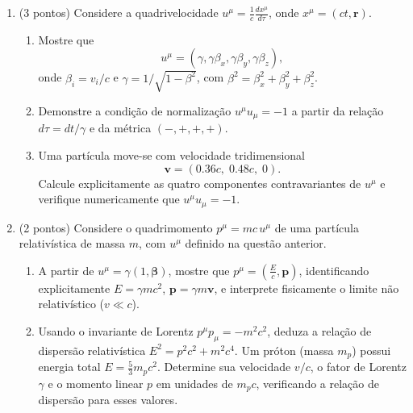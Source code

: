 \begin{enumerate}
\begin{enumerate}
              \item A partir desse resultado, mostre que tanto o intervalo
                    $\Delta s^2 = \eta_{\mu\nu}\,\Delta x^\mu \Delta x^\nu$
                    quanto o tempo próprio
                    $\Delta\tau = \int \sqrt{-\eta_{\mu\nu}\,\dot{x}^\mu\dot{x}^\nu}\,dt$
                    são invariantes sob transformações de Lorentz.
          \end{enumerate}

    \item (3 pontos) Considere a quadrivelocidade
          $u^\mu = \frac{1}{c}\frac{dx^\mu}{d\tau}$, onde $x^\mu = (ct, \mathbf r)$.
          \begin{enumerate}
              \item Mostre que
                    $$
                        u^\mu=(\gamma,\gamma\beta_x,\gamma\beta_y,\gamma\beta_z),
                    $$
                    onde $\beta_i=v_i/c$ e $\gamma=1/\sqrt{1-\beta^2}$, com
                    $\beta^2 = \beta_x^2+\beta_y^2+\beta_z^2$.

              \item Demonstre a condição de normalização $u^\mu u_\mu=-1$ a
                    partir da relação $d\tau = dt/\gamma$ e da métrica
                    $(-,+,+,+)$.

              \item Uma partícula move-se com velocidade tridimensional
                    $$
                        \mathbf v=(0.36c,\;0.48c,\;0).
                    $$
                    Calcule explicitamente as quatro componentes
                    contravariantes de $u^\mu$ e verifique numericamente que
                    $u^\mu u_\mu = -1$.
          \end{enumerate}

    \item (2 pontos) Considere o quadrimomento $p^\mu = mc\,u^\mu$ de uma
          partícula relativística de massa $m$, com $u^\mu$ definido na
          questão anterior.
          \begin{enumerate}
              \item A partir de $u^\mu = \gamma(1, \boldsymbol\beta)$, mostre que
                    $p^\mu = \left( \frac{E}{c}, \mathbf p \right)$,
                    identificando explicitamente $E = \gamma m c^2$,
                    $\mathbf p = \gamma m \mathbf v$, e interprete fisicamente
                    o limite não relativístico ($v \ll c$).

              \item Usando o invariante de Lorentz $p^\mu p_\mu = -m^2 c^2$,
                    deduza a relação de dispersão relativística
                    $E^2 = p^2 c^2 + m^2 c^4$. Um próton (massa $m_p$) possui
                    energia total $E = \tfrac{5}{3} m_p c^2$. Determine sua
                    velocidade $v/c$, o fator de Lorentz $\gamma$ e o momento
                    linear $p$ em unidades de $m_p c$, verificando a relação
                    de dispersão para esses valores.
          \end{enumerate}

\end{enumerate}


